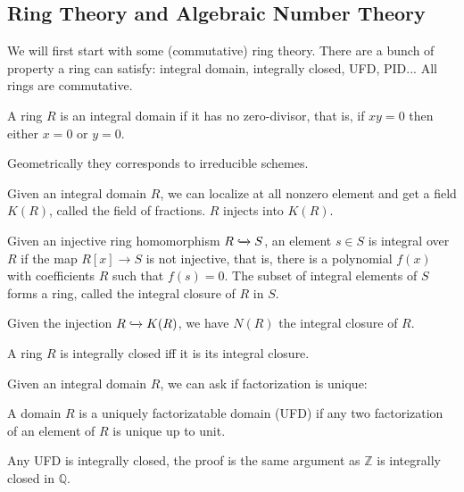 \documentclass[main.tex]{subfiles}
\begin{document}

\subsection{Ring Theory and Algebraic Number Theory}

We will first start with some (commutative) ring theory. There are a bunch of property a ring can satisfy: integral domain, integrally closed, UFD, PID... All rings are commutative.

\begin{definition}
A ring $R$ is an integral domain if it has no zero-divisor, that is, if $xy = 0$ then either $x = 0$ or $y = 0$.
\end{definition}

Geometrically they corresponds to irreducible schemes.

\begin{remark}
Given an integral domain $R$, we can localize at all nonzero element and get a field $K(R)$, called the field of fractions. $R$ injects into $K(R)$.
\end{remark}

\begin{definition}
Given an injective ring homomorphism $R \xhookrightarrow{} S$, an element $s \in S$ is integral over $R$ if the map $R[x] \rightarrow S$ is not injective, that is, there is a polynomial $f(x)$ with coefficients $R$ such that $f(s) = 0$. The subset of integral elements of $S$ forms a ring, called the integral closure of $R$ in $S$.
\end{definition}

Given the injection $R \xhookrightarrow{} K(R)$, we have $N(R)$ the integral closure of $R$.

\begin{definition}
A ring $R$ is integrally closed iff it is its integral closure.
\end{definition}

Given an integral domain $R$, we can ask if factorization is unique:

\begin{definition}
A domain $R$ is a uniquely factorizatable domain (UFD) if any two factorization of an element of $R$ is unique up to unit.
\end{definition}

\begin{lemma}
Any UFD is integrally closed, the proof is the same argument as $\mathbb{Z}$ is integrally closed in $\mathbb{Q}$.
\end{lemma}
\end{document}
